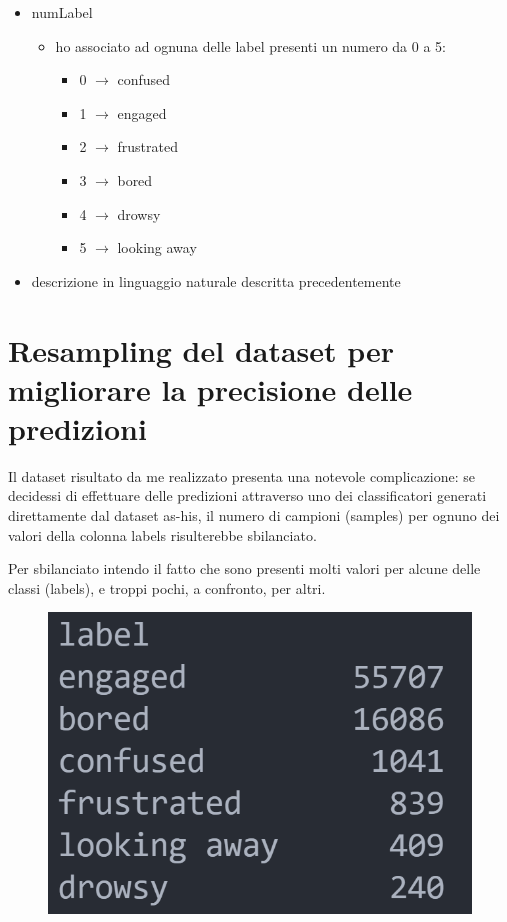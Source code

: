 \begin{itemize}
\begin{itemize}
\begin{itemize}
        \end{itemize}
        \item numLabel
        \begin{itemize}
            \item ho associato ad ognuna delle label presenti un numero da 0 a 5:
            \begin{itemize}
                \item 0 $\rightarrow$ confused
                \item 1 $\rightarrow$ engaged
                \item 2 $\rightarrow$ frustrated
                \item 3 $\rightarrow$ bored
                \item 4 $\rightarrow$ drowsy
                \item 5 $\rightarrow$ looking away
            \end{itemize}
        \end{itemize}
        \item descrizione in linguaggio naturale descritta precedentemente
    \end{itemize}
\end{itemize}

\section{Resampling del dataset per migliorare la precisione delle predizioni} 
Il dataset risultato da me realizzato presenta una notevole complicazione: se decidessi di effettuare delle predizioni attraverso uno dei classificatori generati direttamente dal dataset as-his, il numero di campioni (samples) per ognuno dei valori della colonna labels risulterebbe sbilanciato.

Per sbilanciato intendo il fatto che sono presenti molti valori per alcune delle classi (labels), e troppi pochi, a confronto, per altri.
\begin{figure}
    \begin{center}    
        \includegraphics[width=0.23\linewidth]{images/image42.png}
    \end{center}
\end{figure}

